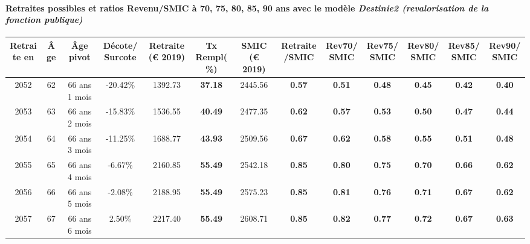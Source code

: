 \paragraph{Retraites possibles et ratios Revenu/SMIC à 70, 75, 80, 85, 90 ans avec le modèle \emph{Destinie2 (revalorisation de la fonction publique)}}  
 
{ \scriptsize \begin{center} 
\begin{tabular}[htb]{|c|c||c|c||c|c||c||c|c|c|c|c|c|} 
\hline 
 Retraite en &  Âge &  Âge pivot &  Décote/Surcote &  Retraite (\euro{} 2019) &  Tx Rempl(\%) &  SMIC (\euro{} 2019) &  Retraite/SMIC &  Rev70/SMIC &  Rev75/SMIC &  Rev80/SMIC &  Rev85/SMIC &  Rev90/SMIC \\ 
\hline \hline 
 2052 &  62 &  66 ans 1 mois &  -20.42\% &  1392.73 &  {\bf 37.18} &  2445.56 &  {\bf {\color{red} 0.57}} &  {\bf {\color{red} 0.51}} &  {\bf {\color{red} 0.48}} &  {\bf {\color{red} 0.45}} &  {\bf {\color{red} 0.42}} &  {\bf {\color{red} 0.40}} \\ 
\hline 
 2053 &  63 &  66 ans 2 mois &  -15.83\% &  1536.55 &  {\bf 40.49} &  2477.35 &  {\bf {\color{red} 0.62}} &  {\bf {\color{red} 0.57}} &  {\bf {\color{red} 0.53}} &  {\bf {\color{red} 0.50}} &  {\bf {\color{red} 0.47}} &  {\bf {\color{red} 0.44}} \\ 
\hline 
 2054 &  64 &  66 ans 3 mois &  -11.25\% &  1688.77 &  {\bf 43.93} &  2509.56 &  {\bf {\color{red} 0.67}} &  {\bf {\color{red} 0.62}} &  {\bf {\color{red} 0.58}} &  {\bf {\color{red} 0.55}} &  {\bf {\color{red} 0.51}} &  {\bf {\color{red} 0.48}} \\ 
\hline 
 2055 &  65 &  66 ans 4 mois &  -6.67\% &  2160.85 &  {\bf 55.49} &  2542.18 &  {\bf {\color{red} 0.85}} &  {\bf {\color{red} 0.80}} &  {\bf {\color{red} 0.75}} &  {\bf {\color{red} 0.70}} &  {\bf {\color{red} 0.66}} &  {\bf {\color{red} 0.62}} \\ 
\hline 
 2056 &  66 &  66 ans 5 mois &  -2.08\% &  2188.95 &  {\bf 55.49} &  2575.23 &  {\bf {\color{red} 0.85}} &  {\bf {\color{red} 0.81}} &  {\bf {\color{red} 0.76}} &  {\bf {\color{red} 0.71}} &  {\bf {\color{red} 0.67}} &  {\bf {\color{red} 0.62}} \\ 
\hline 
 2057 &  67 &  66 ans 6 mois &  2.50\% &  2217.40 &  {\bf 55.49} &  2608.71 &  {\bf {\color{red} 0.85}} &  {\bf {\color{red} 0.82}} &  {\bf {\color{red} 0.77}} &  {\bf {\color{red} 0.72}} &  {\bf {\color{red} 0.67}} &  {\bf {\color{red} 0.63}} \\ 
\hline 
\hline 
\end{tabular} 
\end{center} } 

